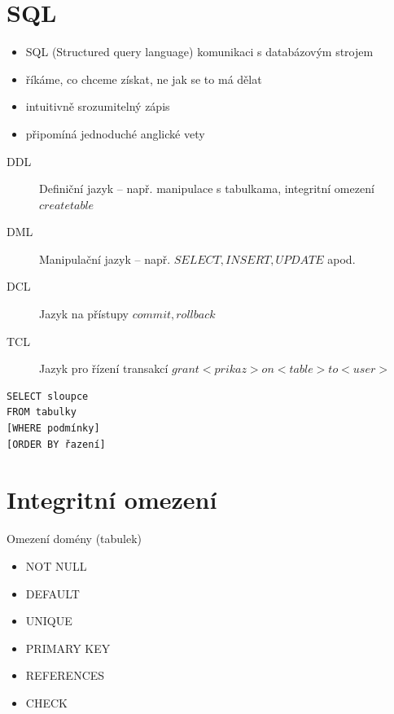 \documentclass{szzclass}
\begin{document}
\section{SQL}
\begin{itemize}
  \item SQL (Structured query language) komunikaci s databázovým strojem
  \item říkáme, co chceme získat, ne jak se to má dělat
  \item intuitivně srozumitelný zápis
  \item připomíná jednoduché anglické vety
\end{itemize}

\begin{description}
  \item[DDL] Definiční jazyk -- např. manipulace s tabulkama, integritní omezení $create table$
  \item[DML] Manipulační jazyk -- např. $SELECT, INSERT, UPDATE$ apod.
  \item[DCL] Jazyk na přístupy $commit, rollback$
  \item[TCL] Jazyk pro řízení transakcí $grant <prikaz> on <table> to <user>$
\end{description}

\begin{verbatim}
SELECT sloupce
FROM tabulky
[WHERE podmínky]
[ORDER BY řazení]
\end{verbatim}

\section{Integritní omezení}
Omezení domény (tabulek)
\begin{itemize}
  \item NOT NULL
  \item DEFAULT
  \item UNIQUE
  \item PRIMARY KEY
  \item REFERENCES
  \item CHECK
\end{itemize}
\end{document}
